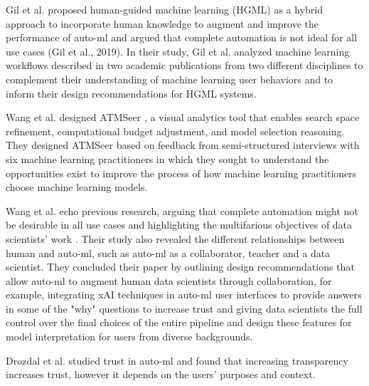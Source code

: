 Gil et al. proposed human-guided machine learning (HGML) as a hybrid approach to incorporate human knowledge to augment and improve the performance of auto-ml and argued that complete automation is not ideal for all use cases (Gil et al., 2019). In their study, Gil et al. analyzed machine learning workflows described in two academic publications from two different disciplines to complement their understanding of machine learning user behaviors and to inform their design recommendations for HGML systems.


Wang et al. designed ATMSeer \cite{wang2018atmseer}, a visual analytics tool that enables search space refinement, computational budget adjustment, and model selection reasoning.  They designed ATMSeer based on feedback from semi-structured interviews with six machine learning practitioners in which they sought to understand the opportunities exist to improve the process of how machine learning practitioners choose machine learning models.  

Wang et al. echo previous research, arguing that complete automation might not be desirable in all use cases and highlighting the multifarious objectives of data scientists' work \cite{DakuoCSCW2019}. Their study also revealed the different relationships between human and auto-ml, such as auto-ml as a collaborator, teacher and a data scientist. They concluded their paper by outlining design recommendations that allow auto-ml to augment human data scientists through collaboration, for example, integrating xAI techniques in auto-ml user interfaces to provide answers in some of the "why" questions to increase trust and giving data scientists the full control over the final choices of the entire pipeline and design these features for model interpretation for users from diverse backgrounds. 

Drozdal et al. studied trust in auto-ml and found that increasing transparency increases trust, however it depends on the users' purposes and context. \cite{DrozdalTrustAutoml}

